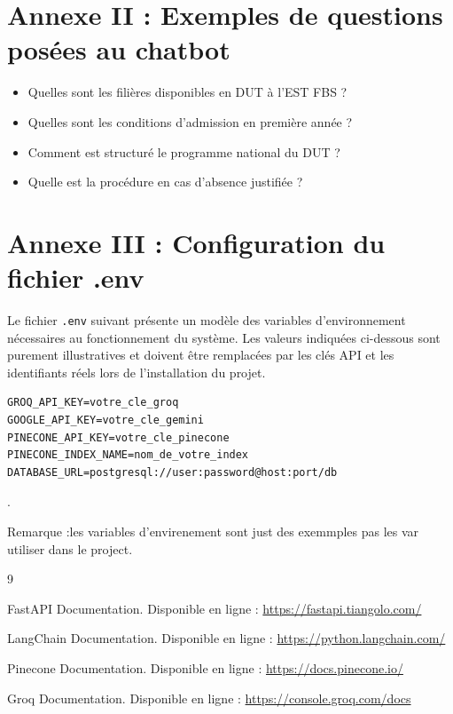 \documentclass[12pt, a4paper, twoside]{report}
\begin{document}
\section*{Annexe II : Exemples de questions posées au chatbot}
\begin{itemize}
    \item \og Quelles sont les filières disponibles en DUT à l'EST FBS ? \fg
    \item \og Quelles sont les conditions d'admission en première année ? \fg
    \item \og Comment est structuré le programme national du DUT ? \fg
    \item \og Quelle est la procédure en cas d'absence justifiée ? \fg
\end{itemize}
\newpage

\section*{Annexe III : Configuration du fichier .env}
Le fichier \texttt{.env} suivant présente un modèle des variables d'environnement nécessaires au fonctionnement du système. Les valeurs indiquées ci-dessous sont purement illustratives et doivent être remplacées par les clés API et les identifiants réels lors de l'installation du projet.

\begin{verbatim}
GROQ_API_KEY=votre_cle_groq
GOOGLE_API_KEY=votre_cle_gemini
PINECONE_API_KEY=votre_cle_pinecone
PINECONE_INDEX_NAME=nom_de_votre_index
DATABASE_URL=postgresql://user:password@host:port/db
\end{verbatim}
.
\newline

Remarque :les variables d'envirenement sont just des exemmples pas les var utiliser dans le project.

\begin{thebibliography}{9}

FastAPI Documentation. Disponible en ligne : \url{https://fastapi.tiangolo.com/}

LangChain Documentation. Disponible en ligne : \url{https://python.langchain.com/}

Pinecone Documentation. Disponible en ligne : \url{https://docs.pinecone.io/}

Groq Documentation. Disponible en ligne : \url{https://console.groq.com/docs}

\end{thebibliography}
\end{document}
